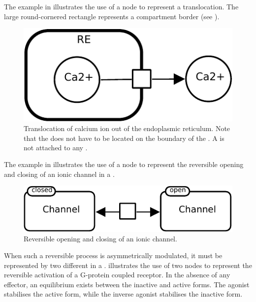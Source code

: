 The example in  illustrates the use of a  node to represent a translocation. The large round-cornered rectangle represents a compartment border (see ).

\begin{figure}[H]
  \centering
  \includegraphics[scale = 0.8]{images/build/process_translocation_example.pdf}
  \caption{Translocation of calcium ion out of the endoplasmic reticulum. Note that the  does not have to be located on the boundary of the . A  is not attached to any .}
  \label{fig:trans-trans}
\end{figure}

The example in  illustrates the use of a  node to represent the reversible opening and closing of an ionic channel in a \PD.

\begin{figure}[H]
  \centering
  \includegraphics[scale = 0.8]{images/build/process_reversible_example.pdf}
  \caption{Reversible opening and closing of an ionic channel.}
  \label{fig:trans-reverse}
\end{figure}

When such a reversible process is asymmetrically modulated, it must be represented by two different  in a \PD.   illustrates the use of two  nodes to represent the reversible activation of a G-protein coupled receptor.  In the absence of any effector, an equilibrium exists between the inactive and active forms.  The agonist stabilises the active form, while the inverse agonist stabilises the inactive form.

